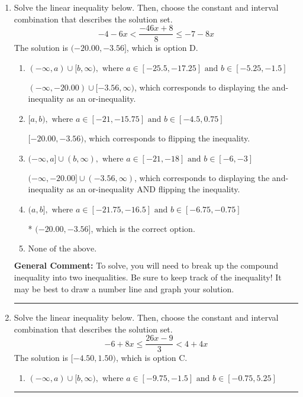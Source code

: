 \documentclass{extbook}[14pt]
\newcommand{\litem}[1]{\item #1

\rule{\textwidth}{0.4pt}}
\begin{document}
\begin{enumerate}
{\begin{enumerate}[label=\Alph*.]
 $(-\infty, 13.0]$, which corresponds to switching the direction of the interval. You likely did this if you did not flip the inequality when dividing by a negative!
\item \( \text{None of the above}. \)

You may have chosen this if you thought the inequality did not match the ends of the intervals.
\end{enumerate}

\textbf{General Comment:} Remember that less/greater than or equal to includes the endpoint, while less/greater do not. Also, remember that you need to flip the inequality when you multiply or divide by a negative.
}
\litem{
Solve the linear inequality below. Then, choose the constant and interval combination that describes the solution set.
\[ -4 - 6 x < \frac{-46 x + 8}{8} \leq -7 - 8 x \]The solution is \( (-20.00, -3.56] \), which is option D.\begin{enumerate}[label=\Alph*.]
\item \( (-\infty, a) \cup [b, \infty), \text{ where } a \in [-25.5, -17.25] \text{ and } b \in [-5.25, -1.5] \)

$(-\infty, -20.00) \cup [-3.56, \infty)$, which corresponds to displaying the and-inequality as an or-inequality.
\item \( [a, b), \text{ where } a \in [-21, -15.75] \text{ and } b \in [-4.5, 0.75] \)

$[-20.00, -3.56)$, which corresponds to flipping the inequality.
\item \( (-\infty, a] \cup (b, \infty), \text{ where } a \in [-21, -18] \text{ and } b \in [-6, -3] \)

$(-\infty, -20.00] \cup (-3.56, \infty)$, which corresponds to displaying the and-inequality as an or-inequality AND flipping the inequality.
\item \( (a, b], \text{ where } a \in [-21.75, -16.5] \text{ and } b \in [-6.75, -0.75] \)

* $(-20.00, -3.56]$, which is the correct option.
\item \( \text{None of the above.} \)


\end{enumerate}

\textbf{General Comment:} To solve, you will need to break up the compound inequality into two inequalities. Be sure to keep track of the inequality! It may be best to draw a number line and graph your solution.
}
\litem{
Solve the linear inequality below. Then, choose the constant and interval combination that describes the solution set.
\[ -6 + 8 x \leq \frac{26 x - 9}{3} < 4 + 4 x \]The solution is \( [-4.50, 1.50) \), which is option C.\begin{enumerate}[label=\Alph*.]
\item \( (-\infty, a) \cup [b, \infty), \text{ where } a \in [-9.75, -1.5] \text{ and } b \in [-0.75, 5.25] \)


\end{enumerate}}
\end{enumerate}
\end{document}
